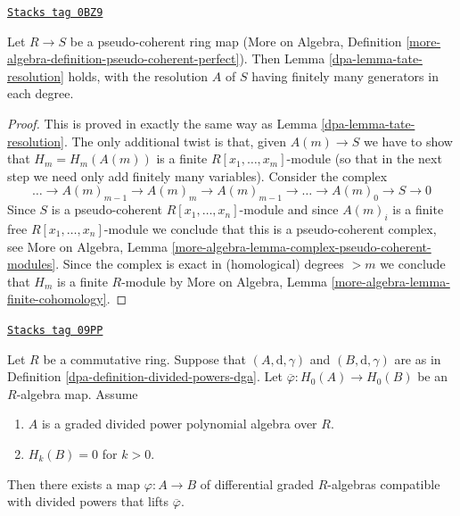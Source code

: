 \begin{lemma}
\label{dpa-lemma-tate-resoluton-pseudo-coherent-ring-map}
\href{https://stacks.math.columbia.edu/tag/0BZ9}{\texttt{Stacks tag 0BZ9}}

Let $R \to S$ be a pseudo-coherent ring map (More on Algebra, Definition
\ref{more-algebra-definition-pseudo-coherent-perfect}). Then
Lemma \ref{dpa-lemma-tate-resolution} holds, with the resolution $A$ of $S$
having finitely many generators in each degree.
\end{lemma}

\begin{proof}

This is proved in exactly the same way as Lemma \ref{dpa-lemma-tate-resolution}.
The only additional twist is that, given $A(m) \to S$ we have to
show that $H_m = H_m(A(m))$ is a finite $R[x_1, \ldots, x_m]$-module
(so that in the next step we need only add finitely many variables).
Consider the complex
$$
\ldots \to A(m)_{m - 1} \to A(m)_m \to A(m)_{m - 1} \to
\ldots \to A(m)_0 \to S \to 0
$$
Since $S$ is a pseudo-coherent $R[x_1, \ldots, x_n]$-module
and since $A(m)_i$ is a finite free $R[x_1, \ldots, x_n]$-module
we conclude that this is a pseudo-coherent complex, see
More on Algebra, Lemma \ref{more-algebra-lemma-complex-pseudo-coherent-modules}.
Since the complex is exact in (homological) degrees $> m$
we conclude that $H_m$ is a finite $R$-module by
More on Algebra, Lemma \ref{more-algebra-lemma-finite-cohomology}.
\end{proof}

\begin{lemma}
\label{dpa-lemma-uniqueness-tate-resolution}
\href{https://stacks.math.columbia.edu/tag/09PP}{\texttt{Stacks tag 09PP}}

Let $R$ be a commutative ring. Suppose that $(A, \text{d}, \gamma)$ and
$(B, \text{d}, \gamma)$ are as in
Definition \ref{dpa-definition-divided-powers-dga}.
Let $\overline{\varphi} : H_0(A) \to H_0(B)$ be an $R$-algebra map.
Assume
\begin{enumerate}
\item $A$ is a graded divided power polynomial algebra over $R$.
\item $H_k(B) = 0$ for $k > 0$.
\end{enumerate}
Then there exists a map $\varphi : A \to B$ of differential
graded $R$-algebras compatible with divided powers
that lifts $\overline{\varphi}$.
\end{lemma}

